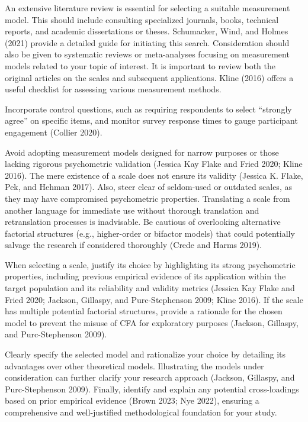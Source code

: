 \documentclass[
  a4paper,
]{article}
\begin{document}
An extensive literature review is essential for selecting a suitable
measurement model. This should include consulting specialized journals,
books, technical reports, and academic dissertations or theses.
Schumacker, Wind, and Holmes (2021) provide a detailed guide for
initiating this search. Consideration should also be given to systematic
reviews or meta-analyses focusing on measurement models related to your
topic of interest. It is important to review both the original articles
on the scales and subsequent applications. Kline (2016) offers a useful
checklist for assessing various measurement methods.

Incorporate control questions, such as requiring respondents to select
``strongly agree'' on specific items, and monitor survey response times
to gauge participant engagement (Collier 2020).

Avoid adopting measurement models designed for narrow purposes or those
lacking rigorous psychometric validation (Jessica Kay Flake and Fried
2020; Kline 2016). The mere existence of a scale does not ensure its
validity (Jessica K. Flake, Pek, and Hehman 2017). Also, steer clear of
seldom-used or outdated scales, as they may have compromised
psychometric properties. Translating a scale from another language for
immediate use without thorough translation and retranslation processes
is inadvisable. Be cautious of overlooking alternative factorial
structures (e.g., higher-order or bifactor models) that could
potentially salvage the research if considered thoroughly (Crede and
Harms 2019).

When selecting a scale, justify its choice by highlighting its strong
psychometric properties, including previous empirical evidence of its
application within the target population and its reliability and
validity metrics (Jessica Kay Flake and Fried 2020; Jackson, Gillaspy,
and Purc-Stephenson 2009; Kline 2016). If the scale has multiple
potential factorial structures, provide a rationale for the chosen model
to prevent the misuse of CFA for exploratory purposes (Jackson,
Gillaspy, and Purc-Stephenson 2009).

Clearly specify the selected model and rationalize your choice by
detailing its advantages over other theoretical models. Illustrating the
models under consideration can further clarify your research approach
(Jackson, Gillaspy, and Purc-Stephenson 2009). Finally, identify and
explain any potential cross-loadings based on prior empirical evidence
(Brown 2023; Nye 2022), ensuring a comprehensive and well-justified
methodological foundation for your study.
\end{document}
